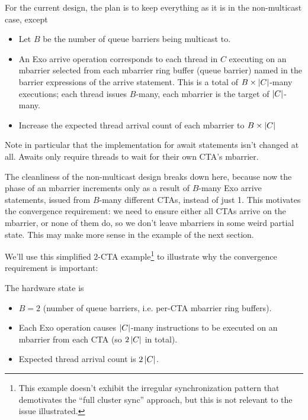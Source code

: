 \filbreak
For the current design, the plan is to keep everything as it is in the non-multicast case, except
\begin{itemize}
  \item Let $B$ be the number of queue barriers being multicast to.
  \filbreak
  \item An Exo arrive operation corresponds to each thread in $C$ executing  on an mbarrier selected from each mbarrier ring buffer (queue barrier) named in the barrier expressions of the arrive statement.
  This is a total of $B\times\left \vert C \right\vert$-many  executions; each thread issues $B$-many, each mbarrier is the target of $\left \vert C \right\vert$-many.
  \filbreak
  \item Increase the expected thread arrival count of each mbarrier to $B\times\left \vert C \right\vert$
\end{itemize}

\filbreak
Note in particular that the implementation for await statements isn't changed at all.
Awaits only require threads to wait for their own CTA's mbarrier.

\filbreak
The cleanliness of the non-multicast design breaks down here, because now the phase of an mbarrier increments only as a result of $B$-many Exo arrive statements, issued from $B$-many different CTAs, instead of just 1.
This motivates the convergence requirement: we need to ensure either all CTAs arrive on the mbarrier, or none of them do, so we don't leave mbarriers in some weird partial state.
This may make more sense in the example of the next section.

\filbreak
{}

We'll use this simplified 2-CTA example\footnote{This example doesn't exhibit the irregular synchronization pattern that demotivates the ``full cluster sync'' approach, but this is not relevant to the issue illustrated.} to illustrate why the convergence requirement is important:



\filbreak
The hardware state is
\begin{itemize}
  \item $B = 2$ (number of queue barriers, i.e. per-CTA mbarrier ring buffers).
  \filbreak
  \item Each Exo  operation causes $\left \vert C \right\vert$-many  instructions to be executed on an mbarrier from each CTA (so $2\left \vert C \right\vert$  in total).
  \filbreak
  \item Expected thread arrival count is $2\left \vert C \right\vert$.
\end{itemize}

